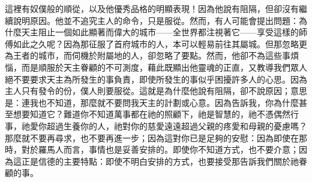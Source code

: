 這裡有奴僕般的順從，以及他優秀品格的明顯表現！因為他說有阻隔，但卻沒有繼續說明原因。他並不追究主人的命令，只是服從。然而，有人可能會提出問題：為什麼天主阻止一個如此顯著而偉大的城市——全世界都注視著它——享受這樣的師傅如此之久呢？因為那征服了首府城市的人，本可以輕易前往其屬城。但那忽略更為王者的城市，而伺機於附屬地的人，卻忽略了要點。然而，他卻不為這些事煩惱，而是順服於天主眷顧的不可測度，藉此既顯出他靈魂的正直，又教導我們眾人絕不要要求天主為所發生的事負責，即使所發生的事似乎困擾許多人的心思。因為主人只有發令的份，僕人則要服從。這就是為什麼他說有阻隔，卻不說原因；意思是：連我也不知道，那麼就不要問我天主的計劃或心意。因為告訴我，你為什麼甚至想要知道它？難道你不知道萬事都在祂的照顧下，祂是智慧的，祂不憑偶然行事，祂愛你超過生養你的人，祂對你的慈愛遠遠超過父親的疼愛和母親的憂慮嗎？那麼就不要再尋求，也不要再進一步；因為這對你已是足夠的安慰：因為即使在那時，對於羅馬人而言，事情也是妥善安排的。即使你不知道方式，也不要介意；因為這正是信德的主要特點：即使不明白安排的方式，也要接受那告訴我們關於祂眷顧的事。\par

